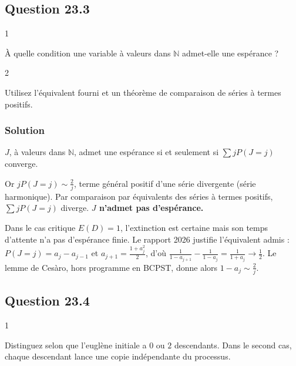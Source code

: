 \documentclass[11pt,a4paper]{article}
\begin{document}
\hypertarget{question-23.3}{%
\subsection{Question 23.3}\label{question-23.3}}

\begin{indication}{1}

À quelle condition une variable à valeurs dans \(\mathbb N\) admet-elle une espérance ?

\end{indication}

\begin{indication}{2}

Utilisez l'équivalent fourni et un théorème de comparaison de séries à termes positifs.

\end{indication}

\hypertarget{solution-49}{%
\subsubsection{Solution}\label{solution-49}}

\(J\), à valeurs dans \(\mathbb N\), admet une espérance si et seulement si \(\sum jP(J=j)\) converge.

Or \(jP(J=j)\sim\frac2j\), terme général positif d'une série divergente (série harmonique). Par comparaison par équivalents des séries à termes positifs, \(\sum jP(J=j)\) diverge. \textbf{\(J\) n'admet pas d'espérance.}

\begin{methode}

Dans le cas critique \(E(D)=1\), l'extinction est certaine mais son temps d'attente n'a pas d'espérance finie. Le rapport 2026 justifie l'équivalent admis : \(P(J=j)=a_j-a_{j-1}\) et \(a_{j+1}=\frac{1+a_j^2}2\), d'où \(\frac1{1-a_{j+1}}-\frac1{1-a_j}=\frac1{1+a_j}\to\frac12\). Le lemme de Cesàro, hors programme en BCPST, donne alors \(1-a_j\sim\frac2j\).

\end{methode}

\hypertarget{question-23.4}{%
\subsection{Question 23.4}\label{question-23.4}}

\begin{indication}{1}

Distinguez selon que l'euglène initiale a \(0\) ou \(2\) descendants. Dans le second cas, chaque descendant lance une copie indépendante du processus.

\end{indication}
\end{document}

